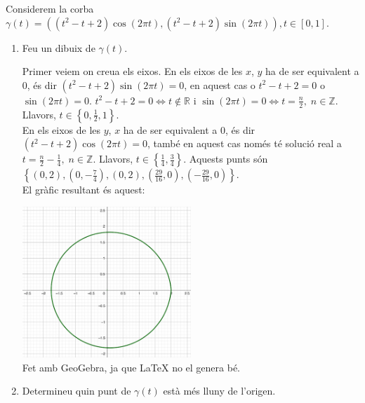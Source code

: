 \documentclass[a4paper, 12pt]{article}
\begin{document}
    \setcounter{numex}{35}
    \begin{exercici}
        Considerem la corba $\gamma(t) = ((t^2-t+2)\cos{(2\pi t)}, (t^2-t+2)\sin{(2\pi t)}), t \in [0, 1]$.
        \begin{enumerate}[label=\alph*)]
            \item Feu un dibuix de $\gamma(t)$.\\
            \begin{solucio}
                Primer veiem on creua els eixos. En els eixos de les $x$, $y$ ha de ser equivalent a $0$,
                és dir $(t^2-t+2)\sin{(2\pi t)} = 0$, en aquest cas o $t^2-t+2 = 0$ o $\sin{(2\pi t)} = 0$.
                $t^2-t+2 = 0 \iff t \not\in \mathbb{R}$ i $\sin{(2\pi t)} = 0 \iff t = \frac{n}{2},\; n \in \mathbb{Z}$.
                Llavors, $t \in \left\{0, \frac{1}{2}, 1\right\}$.\\
                En els eixos de les $y$, $x$ ha de ser equivalent a $0$, és dir $(t^2-t+2)\cos{(2\pi t)} = 0$,
                també en aquest cas només té solució real a $t = \frac{n}{2} - \frac{1}{4},\; n\in \mathbb{Z}$.
                Llavors, $t \in \left\{\frac{1}{4}, \frac{3}{4}\right\}$. Aquests punts són $\left\{\left(0, 2\right), \left(0, -\frac{7}{4}\right), \left(0, 2\right), \left(\frac{29}{16}, 0\right), \left(-\frac{29}{16}, 0\right)\right\}$.\\
                El gràfic resultant és aquest:
                \begin{center}
                    \includegraphics[width=0.5\textwidth]{Grafica.png}\\
                    Fet amb GeoGebra, ja que LaTeX no el genera bé.
                \end{center}
            \end{solucio}
            \item Determineu quin punt de $\gamma(t)$ està més lluny de l'origen.\\

\end{enumerate}
\end{exercici}
\end{document}
